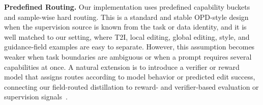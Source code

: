 \noindent\textbf{Predefined Routing.}
Our implementation uses predefined capability buckets and sample-wise hard routing. This is a standard and stable OPD-style design when the supervision source is known from the task or data identity, and it is well matched to our setting, where T2I, local editing, global editing, style, and guidance-field examples are easy to separate. However, this assumption becomes weaker when task boundaries are ambiguous or when a prompt requires several capabilities at once. A natural extension is to introduce a verifier or reward model that assigns routes according to model behavior or predicted edit success, connecting our field-routed distillation to reward- and verifier-based evaluation or supervision signals~\cite{kirstain2023pick,wu2023human,xu2023imagereward,ku2024viescore,fang2026rubric}.

\vspace{0.2cm}